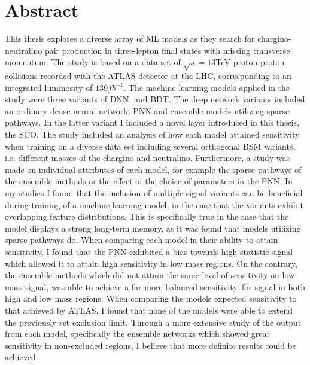 \chapter*{Abstract} 
This thesis explores a diverse array of \acl{ML} models as they search for chargino-neutralino pair production in 
three-lepton final states with missing transverse momentum. The study is based on a data set of $\sqrt{s} = 13$TeV proton-proton
collisions recorded with the ATLAS detector at the LHC, corresponding to an integrated luminosity of $139 fb^{-1}$. The machine 
learning models applied in the study were three variants of \acl{DNN}, and \acl{BDT}. The deep network variants included an ordinary 
dense neural network, \acl{PNN} and ensemble models utilizing sparse pathways. In the latter variant I included a novel layer introduced 
in this thesis, the \acl{SCO}. The study included an analysis of how each model attained sensitivity when training on a diverse data set including 
several orthogonal \acl{BSM} variants, i.e. different masses of the chargino and neutralino. Furthermore, a study was made on individual attributes of each model,
for example the sparse pathways of the ensemble methods or the effect of the choice of parameters in the \acl{PNN}. In my studies I found that the inclusion 
of multiple signal variants can be beneficial during training of a machine learning model, in the case that the variants exhibit overlapping feature distributions. 
This is specifically true in the case that the model displays a strong long-term memory, as it was found that models utilizing sparse pathways do. When comparing each 
model in their ability to attain sensitivity, I found that the \acl{PNN} exhibited a bias towards high statistic signal which allowed it to attain high sensitivity in low 
mass regions. On the contrary, the ensemble methods which did not attain the same level of sensitivity on low mass signal, was able to achieve a far more balanced sensitivity, for  
signal in both high and low mass regions. When comparing the models expected sensitivity to that achieved by ATLAS, I found that none of the models were able to extend the previously set
exclusion limit. Through a more extensive study of the output from each model, specifically the ensemble networks which showed great sensitivity in non-excluded regions, I believe that more definite results 
could be achieved. 
